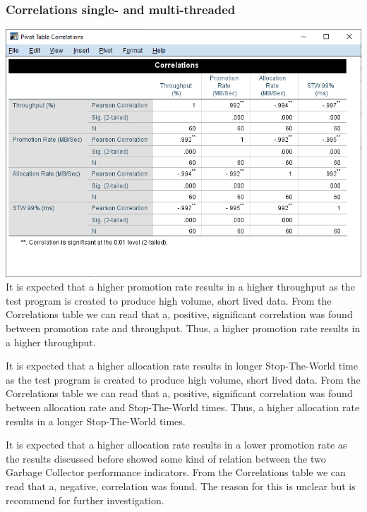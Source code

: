 \documentclass[11pt,a4paper]{article}
\begin{document}
\subsubsection{Correlations single- and multi-threaded}
\includegraphics[width=\linewidth]{Correlations_single.png}
It is expected that a higher promotion rate results in a higher throughput as the test program is created to produce high volume, short lived data. From the Correlations table we can read that a, positive, significant correlation was found between promotion rate and throughput. Thus, a higher promotion rate results in a higher throughput.

It is expected that a higher allocation rate results in longer Stop-The-World time as the test program is created to produce high volume, short lived data. From the Correlations table we can read that a, positive, significant correlation was found between allocation rate and Stop-The-World times. Thus, a higher allocation rate results in a longer Stop-The-World times.

It is expected that a higher allocation rate results in a lower promotion rate as the results discussed before showed some kind of relation between the two Garbage Collector performance indicators. From the Correlations table we can read that a, negative, correlation was found. The reason for this is unclear but is recommend for further investigation.

\newpage
\end{document}
